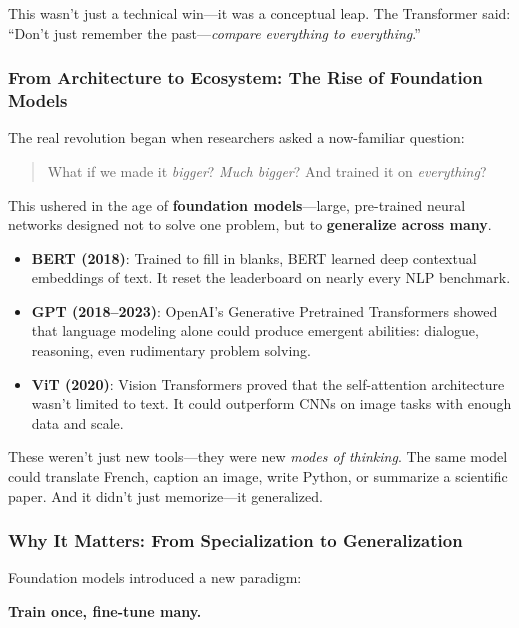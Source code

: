 This wasn’t just a technical win—it was a conceptual leap. The Transformer said: “Don’t just remember the past—\emph{compare everything to everything}.”

\subsubsection{From Architecture to Ecosystem: The Rise of Foundation Models}

The real revolution began when researchers asked a now-familiar question:  
\begin{quote}
What if we made it \emph{bigger}?  
\emph{Much bigger}?  
And trained it on \emph{everything}?  
\end{quote}

This ushered in the age of \textbf{foundation models}—large, pre-trained neural networks designed not to solve one problem, but to \textbf{generalize across many}.

\begin{itemize}
  \item \textbf{BERT (2018)}: Trained to fill in blanks, BERT learned deep contextual embeddings of text. It reset the leaderboard on nearly every NLP benchmark.
  
  \item \textbf{GPT (2018–2023)}: OpenAI’s Generative Pretrained Transformers showed that language modeling alone could produce emergent abilities: dialogue, reasoning, even rudimentary problem solving.
  
  \item \textbf{ViT (2020)}: Vision Transformers proved that the self-attention architecture wasn’t limited to text. It could outperform CNNs on image tasks with enough data and scale.
\end{itemize}

These weren’t just new tools—they were new \emph{modes of thinking}. The same model could translate French, caption an image, write Python, or summarize a scientific paper. And it didn’t just memorize—it generalized.

\subsubsection{Why It Matters: From Specialization to Generalization}

Foundation models introduced a new paradigm:
\begin{center}
\textbf{Train once, fine-tune many.}
\end{center}

